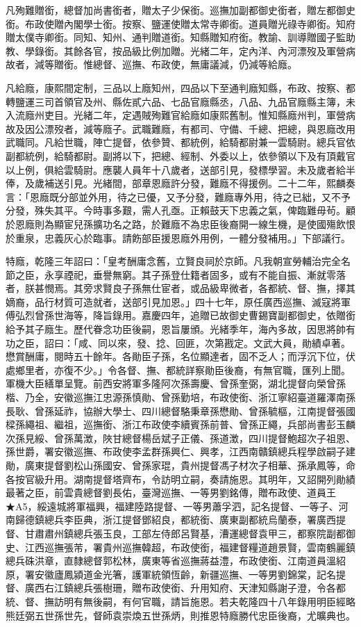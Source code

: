 \begin{pinyinscope}
凡殉難贈銜，總督加尚書銜者，贈太子少保銜。巡撫加副都御史銜者，贈左都御史銜。布政使贈內閣學士銜。按察、鹽運使贈太常寺卿銜。道員贈光祿寺卿銜。知府贈太僕寺卿銜。同知、知州、通判贈道銜。知縣贈知府銜。教諭、訓導贈國子監助教、學錄銜。其餘各官，按品級比例加贈。光緒二年，定內洋、內河漂歿及軍營病故者，減等贈銜。惟總督、巡撫、布政使，無庸議減，仍減等給廕。

凡給廕，康熙間定制，三品以上廕知州，四品以下至通判廕知縣，布政、按察、都轉鹽運三司首領官及州、縣佐貳六品、七品官廕縣丞，八品、九品官廕縣主簿，未入流廕州吏目。光緒二年，定遇賊殉難官給廕如康熙舊制。惟知縣廕州判，軍營病故及因公漂歿者，減等廕子。武職難廕，有都司、守備、千總、把總，與恩廕改用武職同。凡給世職，陣亡提督，依參贊、都統例，給騎都尉兼一雲騎尉。總兵官依副都統例，給騎都尉。副將以下，把總、經制、外委以上，依參領以下及有頂戴官以上例，俱給雲騎尉。應襲人員年十八歲者，送部引見，發標學習。未及歲者給半俸，及歲補送引見。光緒間，部章恩廕許分發，難廕不得援例。二十二年，熙麟奏言：「恩廕既分部並外用，待之已優，又予分發，難廕專外用，待之已絀，又不予分發，殊失其平。今時事多艱，需人孔亟。正賴鼓天下忠義之氣，俾臨難毋茍。顧於恩廕則為顯宦兒孫擴功名之路，於難廕不為忠臣後裔開一線生機，是使國殤飲恨於重泉，忠義灰心於臨事。請飭部臣援恩廕外用例，一體分發補用。」下部議行。

特廕，乾隆三年詔曰：「皇考酬庸念舊，立賢良祠於京師。凡我朝宣勞輔治完全名節之臣，永享禋祀，垂譽無窮。其子孫登仕籍者固多，或有不能自振、漸就零落者，朕甚憫焉。其旁求賢良子孫無仕宦者，或品級卑微者，各都統、督、撫，擇其嫡裔，品行材質可造就者，送部引見加恩。」四十七年，原任廣西巡撫、滅寇將軍傅弘烈曾孫世海等，降旨錄用。嘉慶四年，追贈已故御史曹錫寶副都御史，依贈銜給予其子廕生。歷代眷念功臣後嗣，恩旨屢頒。光緒季年，海內多故，因思將帥有功之臣，詔曰：「咸、同以來，發、捻、回匪，次第戡定。文武大員，勛績卓著。懋賞酬庸，閱時五十餘年。各勛臣子孫，名位顯達者，固不乏人；而浮沉下位，伏處鄉里者，亦復不少。」令各督、撫、都統詳察勛臣後裔，有無官職，匯列上聞。軍機大臣繕單呈覽。前西安將軍多隆阿次孫壽慶、曾孫奎弼，湖北提督向榮曾孫楷、乃全，安徽巡撫江忠源孫慎勛、曾孫勤培，布政使銜、浙江寧紹臺道羅澤南孫長耿、曾孫延祚，協辦大學士、四川總督駱秉章孫懋勛、曾孫毓樞，江南提督張國樑孫繩祖、繼祖，巡撫銜、浙江布政使李續賓孫前普、曾孫正繩，兵部尚書彭玉麟次孫見綏、曾孫萬澂，陜甘總督楊岳斌子正儀、孫道澂，四川提督鮑超次子祖恩、孫世爵，署安徽巡撫、布政使李孟群孫興仁、興孝，江西南贛鎮總兵程學啟嗣子建勛，廣東提督劉松山孫國安、曾孫家琨，貴州提督馮子材次子相華、孫承鳳等，命各按官級升用。湖南提督塔齊布，令訪明立嗣，奏請施恩。其明年，又詔開列勛績最著之臣，前雲貴總督劉長佑，臺灣巡撫、一等男劉銘傳，贈布政使、道員王★A5，綏遠城將軍福興，福建陸路提督、一等男蕭孚泗，記名提督、一等子、河南歸德鎮總兵李臣典，浙江提督鄧紹良，都統銜、廣東副都統烏蘭泰，署廣西提督、甘肅肅州鎮總兵張玉良，工部左侍郎呂賢基，漕運總督袁甲三，都察院副都御史、江西巡撫張芾，署貴州巡撫韓超，布政使銜，福建督糧道趙景賢，雲南鶴麗鎮總兵硃洪章，直隸總督郭松林，廣東等省巡撫蔣益澧，布政使銜、江南道員溫紹原，署安徽廬鳳潁道金光箸，護軍統領恆齡，新疆巡撫、一等男劉錦棠，記名提督、廣西右江鎮總兵張樹珊，贈布政使銜、升用知府、天津知縣謝子澄，令各都統、督、撫訪明有無後嗣，有何官職，請旨施恩。若夫乾隆四十八年錄用明臣經略熊廷弼五世孫世先，督師袁崇煥五世孫炳，則推恩特廕勝代忠臣後裔，尤曠典也。


\end{pinyinscope}

